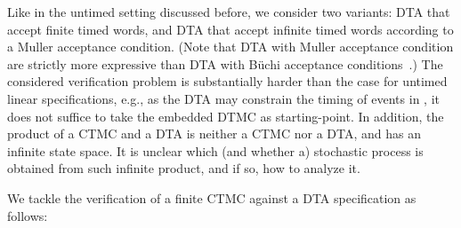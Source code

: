 \documentclass{LMCS}
\newcommand{\<}{\langle}
\renewcommand{\>}{\rangle}
\begin{document}
Like in the untimed setting discussed before, we consider two variants: DTA that accept
finite timed words, and DTA that accept infinite timed words according to a Muller
acceptance condition.
(Note that DTA with Muller acceptance condition are strictly more expressive than
DTA with B\"uchi acceptance conditions~\cite{AD94}.)
The considered verification problem is substantially harder than the case for untimed
linear specifications, e.g., as the DTA may constrain the timing of events in , it
does not suffice to take the embedded DTMC  as starting-point.
In addition, the product of a CTMC and a DTA is neither a CTMC nor a DTA, and has an
infinite state space.
It is unclear which (and whether a) stochastic process is obtained from such infinite
product, and if so, how to analyze it.

We tackle the verification of a finite CTMC against a DTA specification as follows:
\end{document}
